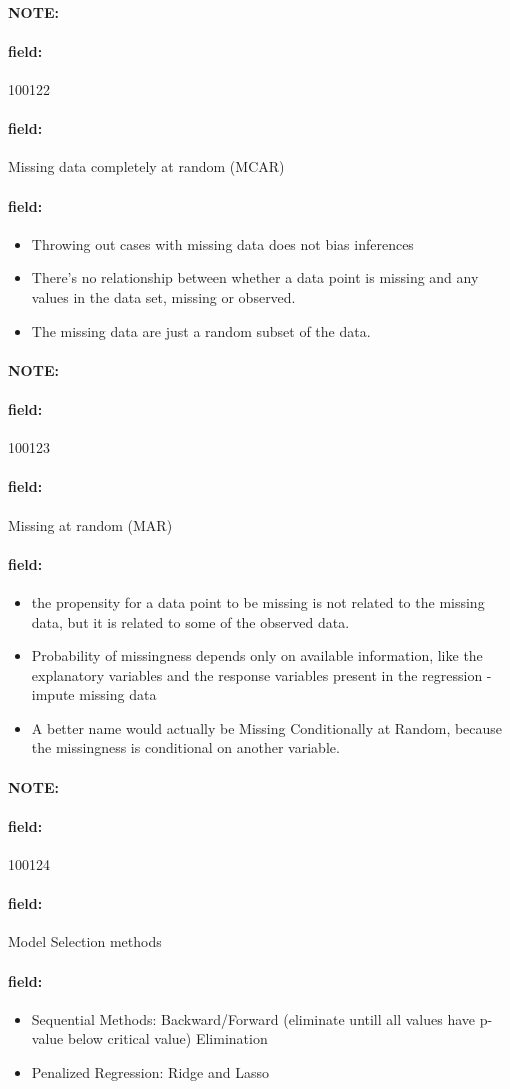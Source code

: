 \documentclass[12pt]{article}
\newenvironment{note}{\paragraph{NOTE:}}{}
\newenvironment{field}{\paragraph{field:}}{}
\begin{document}
\begin{note} \begin{field} \tiny 100122 \end{field}
 \begin{field}
  Missing data completely at random (MCAR)
 \end{field}
 \begin{field}
  \begin{itemize}
   \item Throwing out cases with missing data does not bias inferences
   \item There’s no relationship between whether a data point is missing and any values in the data set, missing or observed.
   \item The missing data are just a random subset of the data.
  \end{itemize}
 \end{field}
\end{note}

\begin{note} \begin{field} \tiny 100123 \end{field}
 \begin{field}
  Missing at random (MAR)
 \end{field}
 \begin{field}
  \begin{itemize}
   \item the propensity for a data point to be missing is not related to the missing data, but it is related to some of the observed data.
   \item Probability of missingness depends only on available information, like the explanatory variables and the response variables present in the regression - impute missing data
   \item A better name would actually be Missing Conditionally at Random, because the missingness is conditional on another variable.
  \end{itemize}

 \end{field}
\end{note}

\begin{note} \begin{field} \tiny 100124 \end{field}
 \begin{field}
  Model Selection methods
 \end{field}
 \begin{field}
  \begin{itemize}
   \item Sequential Methods: Backward/Forward (eliminate untill all values have p-value below critical value) Elimination
   \item Penalized Regression: Ridge and Lasso
  \end{itemize}
 \end{field}
\end{note}
\end{document}
